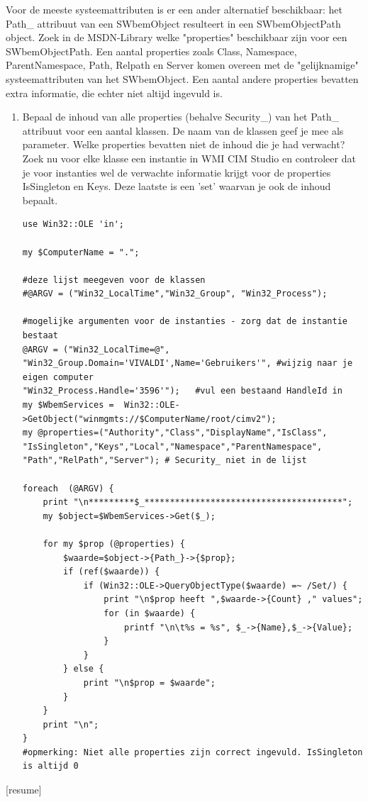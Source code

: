 \documentclass[11pt,a4paper]{report}
\begin{document}
Voor de meeste systeemattributen is er een ander alternatief beschikbaar: het Path\_ attribuut van een SWbemObject resulteert in een SWbemObjectPath object. Zoek in de MSDN-Library welke "properties" beschikbaar zijn voor een SWbemObjectPath. Een aantal properties zoals Class, Namespace, ParentNamespace, Path, Relpath en Server komen overeen met de "gelijknamige" systeemattributen van het SWbemObject. Een aantal andere properties bevatten extra informatie, die echter niet altijd ingevuld is.
\begin{enumerate}[resume]
	\item Bepaal de inhoud van alle properties (behalve Security\_) van het Path\_ attribuut voor een aantal klassen. De naam van de klassen geef je mee als parameter.
	Welke properties bevatten niet de inhoud die je had verwacht?
	Zoek nu voor elke klasse een instantie in WMI CIM Studio en controleer dat je voor instanties wel de verwachte informatie krijgt voor de properties IsSingleton en Keys. Deze laatste is een 'set' waarvan je ook de inhoud bepaalt.
	\begin{lstlisting}
use Win32::OLE 'in';

my $ComputerName = ".";

#deze lijst meegeven voor de klassen
#@ARGV = ("Win32_LocalTime","Win32_Group", "Win32_Process");

#mogelijke argumenten voor de instanties - zorg dat de instantie bestaat
@ARGV = ("Win32_LocalTime=@",
"Win32_Group.Domain='VIVALDI',Name='Gebruikers'", #wijzig naar je eigen computer
"Win32_Process.Handle='3596'");   #vul een bestaand HandleId in
my $WbemServices =  Win32::OLE->GetObject("winmgmts://$ComputerName/root/cimv2");
my @properties=("Authority","Class","DisplayName","IsClass", "IsSingleton","Keys","Local","Namespace","ParentNamespace", "Path","RelPath","Server"); # Security_ niet in de lijst

foreach  (@ARGV) {
	print "\n*********$_***************************************";
	my $object=$WbemServices->Get($_);
	
	for my $prop (@properties) {
		$waarde=$object->{Path_}->{$prop};     
		if (ref($waarde)) {
			if (Win32::OLE->QueryObjectType($waarde) =~ /Set/) {
				print "\n$prop heeft ",$waarde->{Count} ," values";
				for (in $waarde) {
					printf "\n\t%s = %s", $_->{Name},$_->{Value};
				}			
			}
		} else {
			print "\n$prop = $waarde";
		}
	}	
	print "\n";
}
#opmerking: Niet alle properties zijn correct ingevuld. IsSingleton is altijd 0
	\end{lstlisting}
\end{enumerate}[resume]
\end{document}
